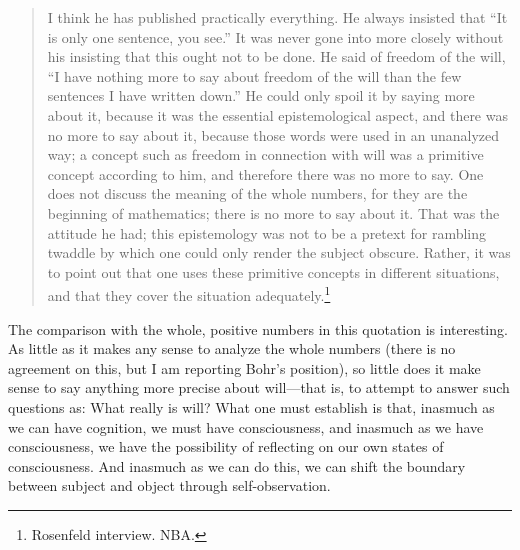 \documentclass[12pt,a4paper]{book}
\begin{document}
\begin{quote}
I think he has published practically everything. He always insisted that ``It is only one sentence, you see.'' It was never gone into more closely without his insisting that this ought not to be done. He said of freedom of the will, ``I have nothing more to say about freedom of the will than the few sentences I have written down.'' He could only spoil it by saying more about it, because it was the essential epistemological aspect, and there was no more to say about it, because those words were used in an unanalyzed way; a concept such as freedom in connection with will was a primitive concept according to him, and therefore there was no more to say. One does not discuss the meaning of the whole numbers, for they are the beginning of mathematics; there is no more to say about it. That was the attitude he had; this epistemology was not to be a pretext for rambling twaddle by which one could only render the subject obscure. Rather, it was to point out that one uses these primitive concepts in different situations, and that they cover the situation adequately.\footnote{Rosenfeld interview. NBA.}
\end{quote}

The comparison with the whole, positive numbers in this quotation is interesting. As little as it makes any sense to analyze the whole numbers (there is no agreement on this, but I am reporting Bohr's position), so little does it make sense to say anything more precise about will---that is, to attempt to answer such questions as: What really is will? What one must establish is that, inasmuch as we can have cognition, we must have consciousness, and inasmuch as we have consciousness, we have the possibility of reflecting on our own states of consciousness. And inasmuch as we can do this, we can shift the boundary between subject and object through self-observation.
\end{document}

